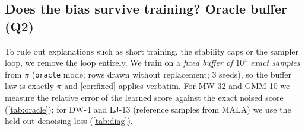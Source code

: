 \subsection{Does the bias survive training? Oracle buffer (Q2)}
\label{sec:exp-oracle}
To rule out explanations such as short training, the stability caps or the sampler loop, we remove the loop entirely. We train on a \emph{fixed buffer of $10^4$ exact samples} from $\pi$ (\texttt{oracle} mode; rows drawn without replacement; 3 seeds), so the buffer law is exactly $\pi$ and \cref{cor:fixed} applies verbatim. For MW-32 and GMM-10 we measure the relative error of the learned score against the exact noised score (\cref{tab:oracle}); for DW-4 and LJ-13 (reference samples from MALA) we use the held-out denoising loss (\cref{tab:diag}).


\begin{table}[t]
\centering
\caption{\textbf{Oracle buffer} (fixed exact samples, no sampler loop; $K=100$; mean $\pm$ std over 3 seeds, except $K{=}1000$: one seed). Relative error $\mathbb{E}\|s_\theta-\nabla\log p_t\|^2/\mathbb{E}\|\nabla\log p_t\|^2$ of the learned score.}
\label{tab:oracle}
\footnotesize
\setlength{\tabcolsep}{2.5pt}
\end{table}



